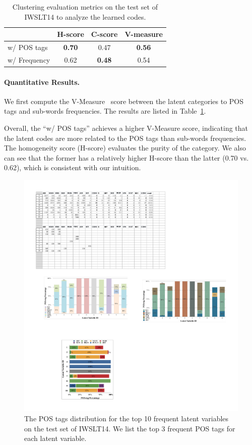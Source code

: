 \begin{table}[tbp]
\small
\tabcolsep 3pt
\centering
\begin{tabular}{lccc} 
\toprule
               & \textbf{H-score}   & \textbf{C-score}  & \textbf{V-measure}    \\
\midrule
w/ POS tags    & \textbf{0.70}      & 0.47              & \textbf{0.56}         \\
w/ Frequency   & 0.62               &\textbf{0.48}      & 0.54                  \\
\bottomrule
\end{tabular}
\caption{Clustering evaluation metrics on the test set of IWSLT14 to analyze the learned codes. }
\label{tab:cluster}
\end{table}
\paragraph{Quantitative Results.} 
We first compute the V-Measure~\cite{vmeasure} score between the latent categories to POS tags and sub-words frequencies. 
The results are listed in Table~\ref{tab:cluster}.

Overall, the ``w/ POS tags'' achieves a higher V-Measure score, indicating that the latent codes are more related to the POS tags than sub-words frequencies.
The homogeneity score (H-score) evaluates the purity of the category.
We also can see that the former has a relatively higher H-score than the latter (0.70 vs. 0.62),  which is consistent with our intuition.

\begin{figure}[tbp]
\centering
\includegraphics[width=\linewidth]{figures/codes3.pdf}
\caption{The POS tags distribution for the top 10 frequent latent variables on the test set of IWSLT14. We list the top 3 frequent POS tags for each latent variable. }
\label{fig:pos_dist}
\end{figure}
